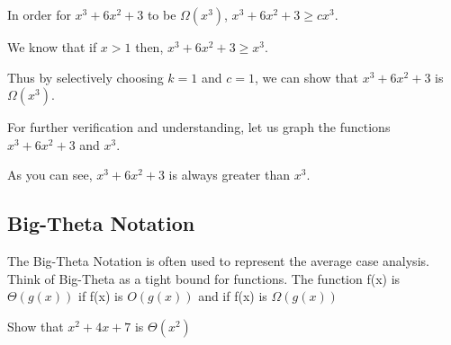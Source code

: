 \begin{solution}
    In order for $x^{3} + 6x^{2} + 3$ to be
    $\Omega(x^{3})$, $x^{3} + 6x^{2} + 3 \geq cx^{3}$.

    We know that if $x > 1$ then, $x^{3} + 6x^{2} + 3 \geq x^{3}$.

    Thus by selectively choosing $k = 1$ and $c = 1$, we can show that $x^{3} +
    6x^{2} + 3$ is $\Omega(x^{3})$.

    For further verification and understanding, let us graph the functions
    $x^{3} + 6x^{2} + 3$ and $x^{3}$.


    As you can see, $x^{3} + 6x^{2} + 3$ is always greater than $x^{3}$.
\end{solution}

\subsection{Big-Theta Notation}
The Big-Theta Notation is often used to represent the average case analysis.
Think of Big-Theta as a tight bound for functions. The function f(x) is
$\Theta(g(x))$ if f(x) is $O(g(x))$ and if f(x) is $\Omega(g(x))$

\begin{example}
Show that $x^{2} + 4x + 7$ is $\Theta(x^{2})$
\end{example}

